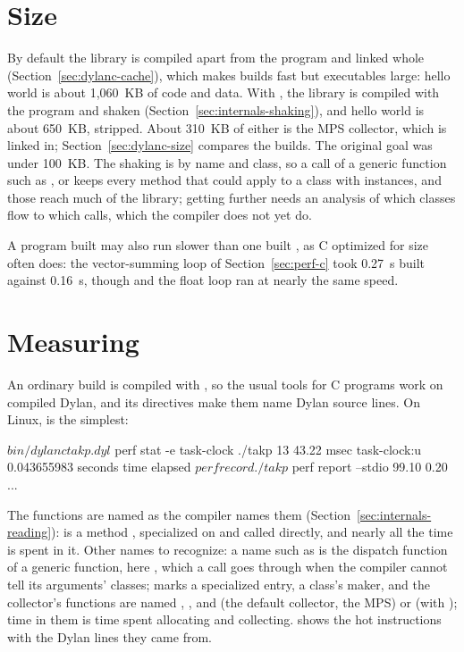 \section{Size}\label{sec:perf-size}

By default the library is compiled apart from the program and linked
whole (Section~\ref{sec:dylanc-cache}), which makes builds fast but
executables large: hello world is about 1,060~KB of code and data. With
, the library is compiled with the program and shaken
(Section~\ref{sec:internals-shaking}), and hello world is about 650~KB,
stripped. About 310~KB of either is the MPS collector, which is linked
in; Section~\ref{sec:dylanc-size} compares the builds. The
original goal was under 100~KB. The shaking is by name and class, so a
call of a generic function such as ,  or
 keeps every method that could apply to a class with instances,
and those reach much of the library; getting further needs an analysis
of which classes flow to which calls, which the compiler does not yet
do.

A program built  may also run slower than one built
, as C optimized for size often does: the vector-summing loop
of Section~\ref{sec:perf-c} took 0.27~s built  against 0.16~s,
though  and the float loop ran at nearly the same speed.

\section{Measuring}\label{sec:perf-measuring}

An ordinary build is compiled with , so the usual tools for C
programs work on compiled Dylan, and its  directives make
them name Dylan source lines. On Linux,  is the simplest:

\begin{shell}
$ bin/dylanc takp.dyl
$ perf stat -e task-clock ./takp
13
             43.22 msec task-clock:u
       0.043655983 seconds time elapsed
$ perf record ./takp
$ perf report --stdio
    99.10%
     0.20%
...
\end{shell}

The functions are named as the compiler names them
(Section~\ref{sec:internals-reading}):  is a method
, specialized on  and called directly, and
nearly all the time is spent in it. Other names to recognize: a name
such as  is the dispatch function
of a generic function, here , which a call goes through when
the compiler cannot tell its arguments' classes;  marks a specialized entry, 
a class's maker, and the collector's functions are named
, ,
 and  (the default
collector, the MPS) or  (with ); time in them is time spent allocating and collecting.
 shows the hot instructions with the Dylan lines they
came from.

